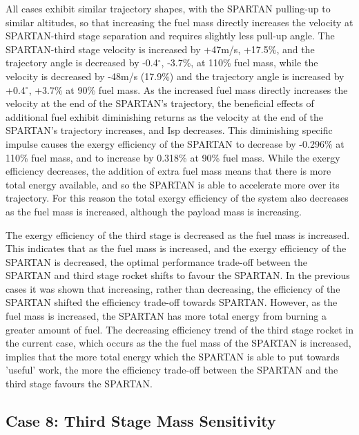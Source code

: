  
All cases exhibit similar trajectory shapes, with the SPARTAN pulling-up to similar altitudes, so that increasing the fuel mass directly increases the velocity at SPARTAN-third stage separation and requires slightly less pull-up angle. The SPARTAN-third stage velocity is increased by +47m/s, +17.5\%, and the trajectory angle is decreased by -0.4$^\circ$, -3.7\%, at 110\% fuel mass, while the velocity is decreased by -48m/s (17.9\%) and the trajectory angle is increased by +0.4$^\circ$, +3.7\% at 90\% fuel mass. 
As the increased fuel mass directly increases the velocity at the end of the SPARTAN's trajectory, the beneficial effects of additional fuel exhibit diminishing returns as the velocity at the end of the SPARTAN's trajectory increases, and Isp decreases.
This diminishing specific impulse causes the exergy efficiency of the SPARTAN to decrease by -0.296\% at 110\% fuel mass, and to increase by 0.318\% at 90\% fuel mass. 
While the exergy efficiency decreases, the addition of extra fuel mass means that there is more total energy available, and so the SPARTAN is able to accelerate more over its trajectory. For this reason the total exergy efficiency of the system also decreases as the fuel mass is increased, although the payload mass is increasing. 

The exergy efficiency of the third stage is decreased as the fuel mass is increased. 
This indicates that as the fuel mass is increased, and the exergy efficiency of the SPARTAN is decreased, the optimal performance trade-off between the SPARTAN and third stage rocket shifts to favour the SPARTAN. 
In the previous cases it was shown that increasing, rather than decreasing, the efficiency of the SPARTAN shifted the efficiency trade-off towards SPARTAN. 
However, as the fuel mass is increased, the SPARTAN has more total energy from burning a greater amount of fuel. 
The decreasing efficiency trend of the third stage rocket in the current case, which occurs as the the fuel mass of the SPARTAN is increased, implies that the more total energy which the SPARTAN is able to put towards 'useful' work, the more the efficiency trade-off between the SPARTAN and the third stage favours the SPARTAN. 

\subsection{Case 8: Third Stage Mass Sensitivity}

